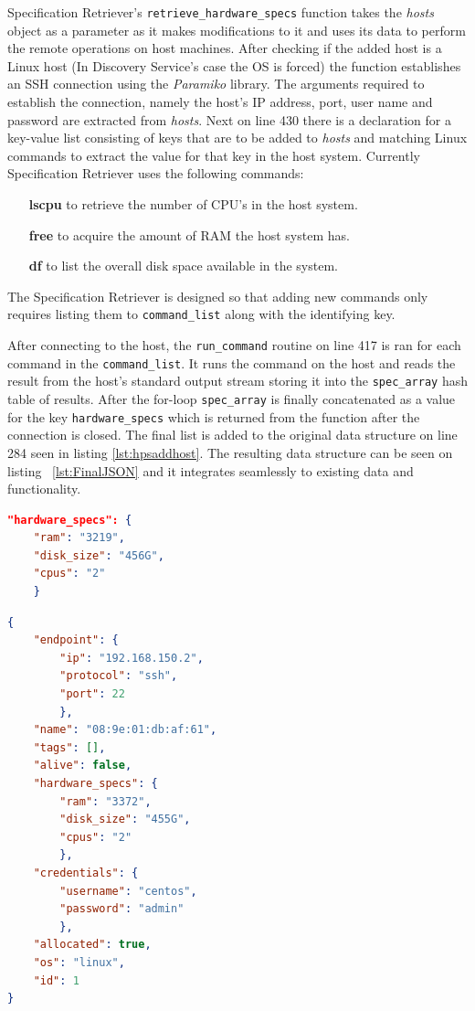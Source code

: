 Specification Retriever's \verb|retrieve_hardware_specs| function takes the \textit{hosts} object as a parameter as it makes modifications to it and uses its data to perform the remote operations on host machines. After checking if the added host is a Linux host (In Discovery Service's case the OS is forced) the function establishes an SSH connection using the \textit{Paramiko} library\cite{paramiko}. The arguments required to establish the connection, namely the host's IP address, port, user name and password are extracted from \textit{hosts}. Next on line 430 there is a declaration for a key-value list consisting of keys that are to be added to \textit{hosts} and matching Linux commands to extract the value for that key in the host system. Currently Specification Retriever uses the following commands:

\begin{itemize}
\item[\textbf{lscpu}] to retrieve the number of CPU's in the host system.
\item[\textbf{free}] to acquire the amount of RAM the host system has.
\item[\textbf{df}] to list the overall disk space available in the system.
\end{itemize}

The Specification Retriever is designed so that adding new commands only requires listing them to \verb|command_list| along with the identifying key. 

After connecting to the host, the \verb|run_command| routine on line 417 is ran for each command in the \verb|command_list|. It runs the command on the host and reads the result from the host's standard output stream storing it into the \verb|spec_array| hash table of results. After the for-loop \verb|spec_array| is finally concatenated as a value for the key \verb|hardware_specs| which is returned from the function after the connection is closed. The final list is added to the original data structure on line 284 seen in listing \ref{lst:hpsaddhost}. The resulting data structure can be seen on listing ~\ref{lst:FinalJSON} and it integrates seamlessly to existing data and functionality.

\begin{lstlisting}[language=json,firstnumber=1, caption={An example of additional data inserted by the Specification Retriever}, captionpos=b, label=lst:JSONSpecs]
"hardware_specs": {
	"ram": "3219", 
	"disk_size": "456G", 
	"cpus": "2"
	}
\end{lstlisting}

\begin{lstlisting}[language=json, firstnumber=1, caption={An example of final data structure after the Specification Retriever has inserted hardware data}, captionpos=b, label=lst:FinalJSON]
{
	"endpoint": {
		"ip": "192.168.150.2", 
		"protocol": "ssh", 
		"port": 22
		},
	"name": "08:9e:01:db:af:61", 
	"tags": [], 
	"alive": false, 
	"hardware_specs": {
		"ram": "3372", 
		"disk_size": "455G", 
		"cpus": "2"
		}, 
	"credentials": {
		"username": "centos", 
		"password": "admin"
		}, 
	"allocated": true, 
	"os": "linux", 
	"id": 1
}

\end{lstlisting}